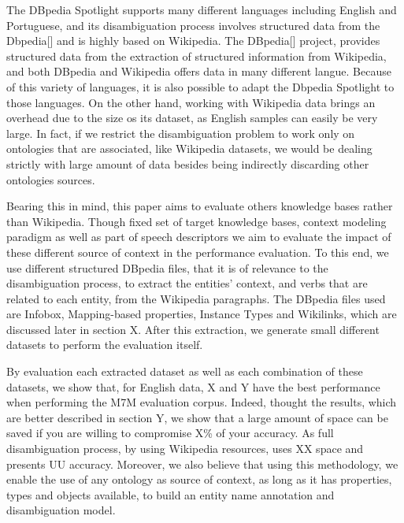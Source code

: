 \documentclass[10pt,a4paper]{article}
\begin{document}
The DBpedia Spotlight  supports many different languages including English and Portuguese, and its disambiguation process  involves  structured data from the Dbpedia[] and is highly based on Wikipedia. The DBpedia[] project, provides structured data from the extraction of structured information from Wikipedia, and  both DBpedia  and Wikipedia offers data in many different langue. Because of this variety of languages,  it is also possible to adapt the Dbpedia Spotlight to those languages. On the other hand, working with Wikipedia data brings an overhead due to the size os its dataset, as English samples can easily be very large. In fact, if we restrict the disambiguation problem to work only on ontologies that are associated, like Wikipedia datasets, we would be  dealing strictly with large amount of data besides being  indirectly discarding other ontologies sources.


Bearing this in mind, this paper aims to evaluate  others knowledge bases rather than Wikipedia.  Though fixed set of target knowledge bases, context modeling paradigm as well as part of speech descriptors we aim to evaluate the impact of these different source of context in the performance evaluation. To this end, we use different structured DBpedia files, that it is of relevance to the disambiguation process, to extract the entities' context, and verbs that are related to each entity, from the Wikipedia paragraphs. The DBpedia files used  are Infobox, Mapping-based properties, Instance Types and Wikilinks, which are discussed later in section X. After this extraction,  we generate small different datasets to perform the evaluation itself.

By evaluation each extracted dataset as well as each combination of these datasets, we  show that, for English data, X and Y have the best performance when performing  the M7M evaluation corpus. Indeed,  thought the results, which are better described in section Y, we show  that a large amount of space can be saved if you are willing to compromise X\% of your accuracy. As full disambiguation process, by using Wikipedia resources, uses XX space and presents UU accuracy. Moreover, we also believe that using this methodology, we enable the use of any ontology as source of context, as long as it has properties, types and objects available, to build an entity name annotation and disambiguation model.



\end{document}
